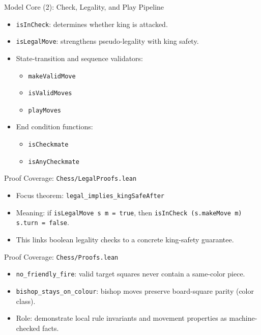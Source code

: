 \documentclass{beamer}
\begin{document}
\begin{frame}{Model Core (2): Check, Legality, and Play Pipeline}
\begin{itemize}
  \item \texttt{isInCheck}: determines whether king is attacked.
  \item \texttt{isLegalMove}: strengthens pseudo-legality with king safety.
  \item State-transition and sequence validators:
  \begin{itemize}
    \item \texttt{makeValidMove}
    \item \texttt{isValidMoves}
    \item \texttt{playMoves}
  \end{itemize}
  \item End condition functions:
  \begin{itemize}
    \item \texttt{isCheckmate}
    \item \texttt{isAnyCheckmate}
  \end{itemize}
\end{itemize}
\end{frame}

\begin{frame}{Proof Coverage: \texttt{Chess/LegalProofs.lean}}
\begin{itemize}
  \item Focus theorem: \texttt{legal\_implies\_kingSafeAfter}
  \item Meaning: if \texttt{isLegalMove s m = true}, then
  \texttt{isInCheck (s.makeMove m) s.turn = false}.
  \item This links boolean legality checks to a concrete king-safety guarantee.
\end{itemize}
\end{frame}

\begin{frame}{Proof Coverage: \texttt{Chess/Proofs.lean}}
\begin{itemize}
  \item \texttt{no\_friendly\_fire}:
  valid target squares never contain a same-color piece.
  \item \texttt{bishop\_stays\_on\_colour}:
  bishop moves preserve board-square parity (color class).
  \item Role: demonstrate local rule invariants and movement properties as machine-checked facts.
\end{itemize}
\end{frame}
\end{document}
